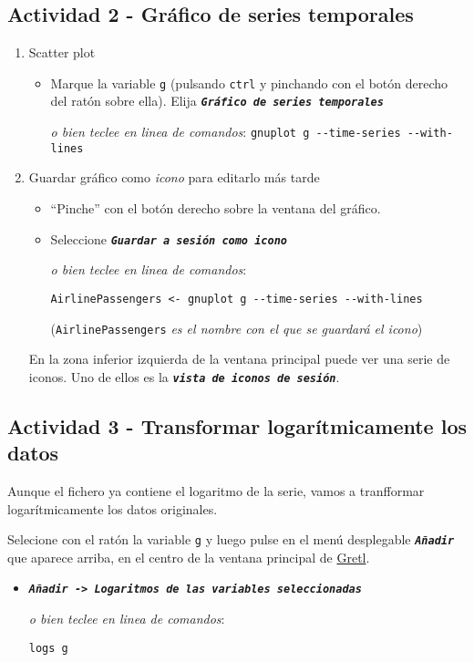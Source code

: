 \documentclass[11pt]{article}
\begin{document}
\subsection{Actividad 2 - Gráfico de series temporales}
\label{sec:org37a38b4}
\begin{enumerate}
\item Scatter plot
\label{sec:org0f7c8a8}
\begin{itemize}
\item Marque la variable \texttt{g} (pulsando \texttt{ctrl} y pinchando con el botón
derecho del ratón sobre ella). Elija \textbf{\emph{\texttt{Gráfico de series temporales}}}

{\vspace{1pt} \footnotesize \color{gray!70!black}
\emph{o bien teclee en linea de comandos}: \texttt{gnuplot g -{}-{}time-series -{}-{}with-lines}
}
\end{itemize}

\item Guardar gráfico como \emph{icono} para editarlo más tarde
\label{sec:orgca9d159}
\begin{itemize}
\item ``Pinche'' con el botón derecho sobre la ventana del gráfico.
\item Seleccione \textbf{\emph{\texttt{Guardar a sesión como icono}}}

{\vspace{1pt} \footnotesize \color{gray!70!black} \color{gray!70!black}
\emph{o bien teclee en linea de comandos}:
\begin{verbatim}
AirlinePassengers <- gnuplot g --time-series --with-lines
\end{verbatim}
(\texttt{AirlinePassengers} \emph{es el nombre con el que se guardará el icono})
}
\end{itemize}

En la zona inferior izquierda de la ventana principal puede ver una
serie de iconos. Uno de ellos es la \textbf{\emph{\texttt{vista de iconos de sesión}}}.
\end{enumerate}


\subsection{Actividad 3 - Transformar logarítmicamente los datos}
\label{sec:org4628ffb}
Aunque el fichero ya contiene el logaritmo de la serie, vamos a
tranfformar logarítmicamente los datos originales.

Selecione con el ratón la variable \texttt{g} y luego pulse en el menú desplegable \textbf{\emph{\texttt{Añadir}}} que aparece arriba, en el centro de la
ventana principal de \href{https://gretl.sourceforge.net/es.html}{Gretl}.
\begin{itemize}
\item \textbf{\emph{\texttt{Añadir -> Logaritmos de las variables seleccionadas}}}

{\vspace{0pt} \footnotesize \color{gray!70!black}
\emph{o bien teclee en linea de comandos}: 
\begin{verbatim}
logs g
\end{verbatim}
}
\end{itemize}
\end{document}
